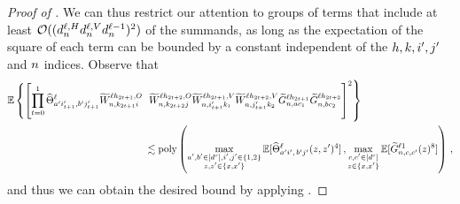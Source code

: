 \begin{proof}[Proof of ]
    We can thus restrict our attention to groups of terms that include at least $\mathcal{O}((d_{n}^{\ell, H} d_{n}^{\ell, V} d_{n}^{\ell - 1})^2)$ of the summands, as long as the expectation of the square of each term can be bounded by a constant independent of the $h, k, i', j'$ and $n$ indices.
    Observe that
    \begin{align}\label{eq:gg_bound}
        \E \left\{
            \left[
            \prod_{t=0}^1
                    \ntkhat_{
                        \gIndexA \gIndexZA_{t+1} ,
                        \gIndexB \gIndexZB_{t+1}
                    }^{\depthSymbol}
                    \uW_{\sequenceVariable , k_{2t + 1} i}^{\depthSymbol \headIndex_{2t + 1} , \outputSymbol}
                    \right.\right.
                    &\left.\left.
                    \vphantom{\prod_{t=0}^1}
                    \uW_{\sequenceVariable , k_{2t + 2} j}^{\depthSymbol \headIndex_{2t + 2} , \outputSymbol}
                    \uW_{\sequenceVariable, \gIndexZA_{t + 1} k_1}^{\depthSymbol \headIndex_{2t + 1}, \valueSymbol}
                    \uW_{\sequenceVariable, \gIndexZB_{t + 1} k_2}^{\depthSymbol \headIndex_{2t + 2}, \valueSymbol}
                    \tildeLogit{\sequenceVariable, \fIndexA c_1}{\depthSymbol\headIndex_{2t + 1}}
                    \tildeLogit{\sequenceVariable, \fIndexB c_2}{\depthSymbol\headIndex_{2t + 2}}
            \right]^2
        \right\}
        \nonumber
        \\
        &\lesssim
        \poly \left(
            \max_{\substack{
                \gIndexA, \gIndexB \in [\spatialDimension],
                \gIndexZA, \gIndexZB \in \{ 1, 2 \} \\
                z, z' \in \{ \inputSymbol, \inputSymbol' \}
            }}
                \E [
                    \ntkhat_{
                        \gIndexA \gIndexZA , \,
                        \gIndexB \gIndexZB
                    }^{\depthSymbol} (z, z')^4
                ]
            \, ,
            \max_{\substack{
                c, c' \in [\spatialDimension]  \\
                z \in \{ \inputSymbol , \inputSymbol' \}
            }}
                \E [
                    \tildeLogit{\sequenceVariable, c , c'}{\depthSymbol 1} (z)^8
                ]
        \right)
        \, ,
    \end{align}
    and thus we can obtain the desired bound by applying .

\end{proof}
